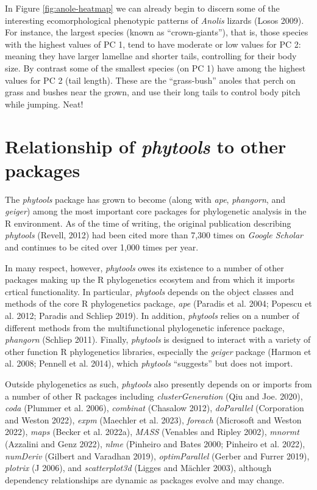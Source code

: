 \documentclass[fleqn,10pt,lineno]{wlpeerj} %
\begin{document}
In Figure \ref{fig:anole-heatmap} we can already begin to discern some of the interesting ecomorphological phenotypic patterns of \emph{Anolis} lizards (Losos 2009). For instance, the largest species (known as ``crown-giants''), that is, those species with the highest values of PC 1, tend to have moderate or low values for PC 2: meaning they have larger lamellae and shorter tails, controlling for their body size. By contrast some of the smallest species (on PC 1) have among the highest values for PC 2 (tail length). These are the ``grass-bush'' anoles that perch on grass and bushes near the grown, and use their long tails to control body pitch while jumping. Neat!

\hypertarget{relationship-of-phytools-to-other-packages}{%
\section{\texorpdfstring{Relationship of \emph{phytools} to other packages}{Relationship of phytools to other packages}}\label{relationship-of-phytools-to-other-packages}}

The \emph{phytools} package has grown to become (along with \emph{ape}, \emph{phangorn}, and \emph{geiger}) among the most important core packages for phylogenetic analysis in the R environment. As of the time of writing, the original publication describing \emph{phytools} (Revell, 2012) had been cited more than 7,300 times on \emph{Google Scholar} and continues to be cited over 1,000 times per year.

In many respect, however, \emph{phytools} owes its existence to a number of other packages making up the R phylogenetics ecosytem and from which it imports crtical functionality. In particular, \emph{phytools} depends on the object classes and methods of the core R phylogenetics package, \emph{ape} (Paradis et al. 2004; Popescu et al. 2012; Paradis and Schliep 2019). In addition, \emph{phytools} relies on a number of different methods from the multifunctional phylogenetic inference package, \emph{phangorn} (Schliep 2011). Finally, \emph{phytools} is designed to interact with a variety of other function R phylogenetics libraries, especially the \emph{geiger} package (Harmon et al. 2008; Pennell et al. 2014), which \emph{phytools} ``suggests'' but does not import.

Outside phylogenetics as such, \emph{phytools} also presently depends on or imports from a number of other R packages including \emph{clusterGeneration} (Qiu and Joe. 2020), \emph{coda} (Plummer et al. 2006), \emph{combinat} (Chasalow 2012), \emph{doParallel} (Corporation and Weston 2022), \emph{expm} (Maechler et al. 2023), \emph{foreach} (Microsoft and Weston 2022), \emph{maps} (Becker et al. 2022a), \emph{MASS} (Venables and Ripley 2002), \emph{mnormt} (Azzalini and Genz 2022), \emph{nlme} (Pinheiro and Bates 2000; Pinheiro et al. 2022), \emph{numDeriv} (Gilbert and Varadhan 2019), \emph{optimParallel} (Gerber and Furrer 2019), \emph{plotrix} (J 2006), and \emph{scatterplot3d} (Ligges and Mächler 2003), although dependency relationships are dynamic as packages evolve and may change.
\end{document}
